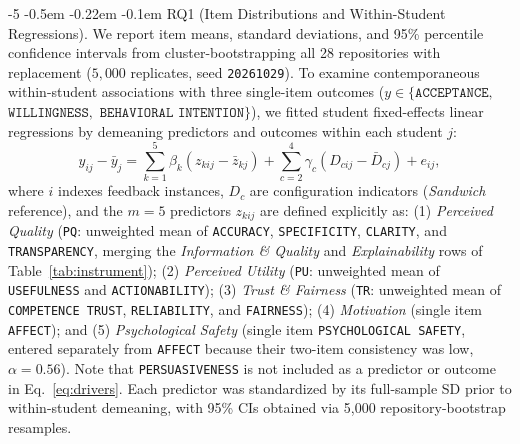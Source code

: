\documentclass{llncs}
\makeatletter
\renewcommand\paragraph{\@startsection{paragraph}{4}{\z@}%
                       {-5\p@ \@plus -1\p@ \@minus -1\p@}%
                       {-0.5em \@plus -0.22em \@minus -0.1em}%
                       {\normalfont\normalsize\itshape}}
\makeatother
\begin{document}
\paragraph{RQ1 (Item Distributions and Within-Student Regressions).}
We report item means, standard deviations, and 95\% percentile confidence intervals from cluster-bootstrapping all 28 repositories with replacement ($5{,}000$ replicates, seed \texttt{20261029}). To examine contemporaneous within-student associations with three single-item outcomes ($y \in \{\texttt{ACCEPTANCE},$ $\texttt{WILLINGNESS},$ $\texttt{BEHAVIORAL INTENTION}\}$), we fitted student fixed-effects linear regressions by demeaning predictors and outcomes within each student $j$:
\begin{equation}
 y_{ij}-\bar y_j = \sum_{k=1}^{5}\beta_k(z_{kij}-\bar z_{kj}) + \sum_{c=2}^{4}\gamma_c(D_{cij}-\bar D_{cj}) + e_{ij},
 \label{eq:drivers}
\end{equation}
where $i$ indexes feedback instances, $D_c$ are configuration indicators (\textit{Sandwich} reference), and the $m = 5$ predictors $z_{kij}$ are defined explicitly as: (1) \emph{Perceived Quality} (\texttt{PQ}: unweighted mean of \texttt{ACCURACY}, \texttt{SPECIFICITY}, \texttt{CLARITY}, and \texttt{TRANSPARENCY}, merging the \emph{Information \& Quality} and \emph{Explainability} rows of Table~\ref{tab:instrument}); (2) \emph{Perceived Utility} (\texttt{PU}: unweighted mean of \texttt{USEFULNESS} and \texttt{ACTIONABILITY}); (3) \emph{Trust \& Fairness} (\texttt{TR}: unweighted mean of \texttt{COMPETENCE TRUST}, \texttt{RELIABILITY}, and \texttt{FAIRNESS}); (4) \emph{Motivation} (single item \texttt{AFFECT}); and (5) \emph{Psychological Safety} (single item \texttt{PSYCHOLOGICAL SAFETY}, entered separately from \texttt{AFFECT} because their two-item consistency was low, $\alpha = 0.56$). Note that \texttt{PERSUASIVENESS} is not included as a predictor or outcome in Eq.~\ref{eq:drivers}. Each predictor was standardized by its full-sample SD prior to within-student demeaning, with 95\% CIs obtained via 5,000 repository-bootstrap resamples.
\end{document}

